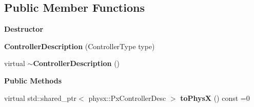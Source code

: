 \subsection*{Public Member Functions}
\begin{Indent}\textbf{ Destructor}\par
\begin{DoxyCompactItemize}
\item 
\mbox{\label{classrev_1_1_controller_description_af616574e08eed353c357d600bb1982e6}} 
{\bfseries Controller\+Description} (Controller\+Type type)
\item 
\mbox{\label{classrev_1_1_controller_description_a42f9f265be028f29429dc8264366aa45}} 
virtual {\bfseries $\sim$\+Controller\+Description} ()
\end{DoxyCompactItemize}
\end{Indent}
\begin{Indent}\textbf{ Public Methods}\par
\begin{DoxyCompactItemize}
\item 
\mbox{\label{classrev_1_1_controller_description_a38cf89621db3d6e90223cd7957594603}} 
virtual std\+::shared\+\_\+ptr$<$ physx\+::\+Px\+Controller\+Desc $>$ {\bfseries to\+PhysX} () const =0
\end{DoxyCompactItemize}
\end{Indent}
